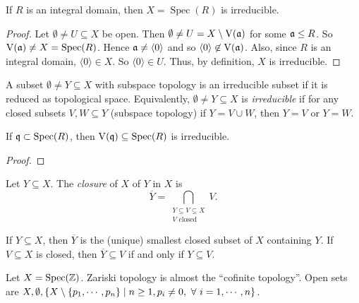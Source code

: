 \begin{example}
    If $R$ is an integral domain, then $X = \operatorname{Spec}(R)$ is irreducible.
\end{example}

\begin{proof}
    Let $\emptyset \neq U \subseteq X$ be open. Then $\emptyset \neq U = X \setminus \operatorname{V}(\mathfrak{a})$ for some $\mathfrak{a} \leq R$. So $\operatorname{V}(\mathfrak{a}) \neq X = \operatorname{Spec}(R)$. Hence $\mathfrak{a} \neq \langle 0 \rangle$ and so $\langle 0 \rangle \not \in \operatorname{V}(\mathfrak{a})$. Also, since $R$ is an integral domain, $\langle 0 \rangle \in X$. So $\langle 0 \rangle \in U$. Thus, by definition, $X$ is irreducible.
\end{proof}

\begin{definition*}[2.33+]
    A subset $\emptyset \neq Y \subseteq X$ with subspace topology is an irreducible subset if it is reduced as topological space. Equivalently, $\emptyset \neq Y \subseteq X$ is \emph{irreducible} if for any closed subsets $V,W \subseteq Y$ (subspace topology) if $Y = V \cup W$, then $Y = V$ or $Y = W$.
\end{definition*}

\begin{corollary}
    If $\mathfrak{q} \subset \operatorname{Spec}(R)$, then $\operatorname{V}(\mathfrak{q}) \subseteq \operatorname{Spec}(R)$ is irreducible.
\end{corollary}

\begin{proof}

\end{proof}

\begin{definition}
    Let $Y \subseteq X$. The \emph{closure} of $X$ of $Y$ in $X$ is 
    \[\overbar Y = \bigcap_{\substack{Y \subseteq V \subseteq X \\ V \text{ closed}}}V.\]
\end{definition}

\begin{fact}
    If $Y \subseteq X$, then $\overbar Y$ is the (unique) smallest closed subset of $X$ containing $Y$. If $V \subseteq X$ is closed, then $\overbar Y \subseteq V$ if and only if $Y \subseteq V$.
\end{fact}

\begin{example*}
    Let $X = \operatorname{Spec}(\mathbb{Z})$. Zariski topology is almost the ``cofinite topology''.  Open sets are $X,\emptyset, \{X \setminus \{p_1,\cdots,p_n\} \mid n \geq 1, p_i \neq 0,\ \forall \  i = 1,\cdots,n\}$.
\end{example*}

